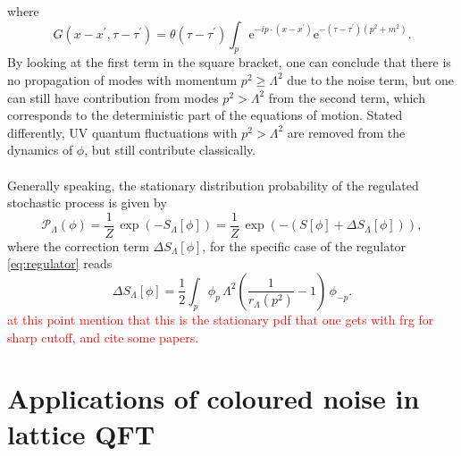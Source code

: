 where
\begin{equation*}
    G\left(x-x^{\prime}, \tau-\tau^{\prime}\right) =\theta\left(\tau-\tau^{\prime}\right) \int_p \mathrm{e}^{-i p \cdot\left(x-x^{\prime}\right)} \mathrm{e}^{-\left(\tau-\tau^{\prime}\right)\left(p^2+m^2\right)}.
\end{equation*}
By looking at the first term in the square bracket, one can conclude that there is no propagation of modes with momentum $p^2\geq \Lambda^2$ due to the noise term, but one can still have contribution from modes $p^2 > \Lambda^2$ from the second term, which corresponds to the deterministic part of the equations of motion. Stated differently, UV quantum fluctuations with $p^2 > \Lambda^2$ are removed from the dynamics of $\phi$, but still contribute classically. \\~\\
Generally speaking, the stationary distribution probability of the regulated stochastic process is given by \cite{Pawlowski2017CoolingNoise}
\begin{equation}
    \mathcal{P}_\Lambda(\phi) = \frac{1}{Z} \, \exp\left(-S_\Lambda[\phi]\right) = \frac{1}{Z} \, \exp\left(-(S[\phi] + \Delta S_\Lambda[\phi])\right),
    \label{eq:probability_field_configuration_regularised}
\end{equation}
where the correction term $\Delta S_\Lambda[\phi]$, for the specific case of the regulator \eqref{eq:regulator} reads
\begin{equation*}
        \Delta S_{\Lambda}[\phi]=\frac{1}{2} \int_p \phi_p \, \Lambda^2\left(\frac{1}{r_{\Lambda}\left(p^2\right)}-1\right) \, \phi_{-p}.
\end{equation*}
\textcolor{red}{at this point mention that this is the stationary pdf that one gets with frg for sharp cutoff, and cite some papers.}

\section{Applications of coloured noise in lattice QFT}
\label{sec:lattice_with_coloured_noise}

